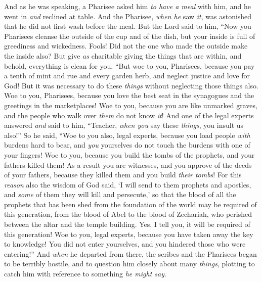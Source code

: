 \begin{biblechapter}
 And as he was speaking, a Pharisee asked him \textit{to have a meal} with him, and he went in \textit{and} reclined at table.
\verse And the Pharisee, \textit{when he} saw \textit{it}, was astonished that he did not first wash before the meal.
\verse But the Lord said to him, “Now you Pharisees cleanse the outside of the cup and of the dish, but your inside is full of greediness and wickedness.
\verse Fools! Did not the one who made the outside make the inside also?
\verse But give \textit{as} charitable giving the things that are within, and behold, everything is clean for you.
\verse “But woe to you, Pharisees, because you pay a tenth of mint and rue and every garden herb, and neglect justice and love for God! But it was necessary to do these \textit{things} without neglecting those things also.
\verse Woe to you, Pharisees, because you love the best seat in the synagogues and the greetings in the marketplaces!
\verse Woe to you, because you are like unmarked graves, and the people who walk over \textit{them} do not know \textit{it}!
\verse And one of the legal experts answered \textit{and} said to him, “Teacher, \textit{when you} say these \textit{things}, you insult us also!”
\verse So he said, “Woe to you also, legal experts, because you load people \textit{with} burdens hard to bear, and \textit{you} yourselves do not touch the burdens with one of your fingers!
\verse Woe to you, because you build the tombs of the prophets, and your fathers killed them!
\verse As a result you are witnesses, and you approve of the deeds of your fathers, because they killed them and you build \textit{their tombs}!
\verse For this \textit{reason} also the wisdom of God said, ‘I will send to them prophets and apostles, and \textit{some} of them they will kill and persecute,’
\verse so that the blood of all the prophets that has been shed from the foundation of the world may be required of this generation,
\verse from the blood of Abel to the blood of Zechariah, who perished between the altar and the temple building. Yes, I tell you, it will be required of this generation!
\verse Woe to you, legal experts, because you have taken away the key to knowledge! You did not enter yourselves, and you hindered those who were entering!”
\verse And \textit{when} he departed from there, the scribes and the Pharisees began to be terribly hostile, and to question him closely about many \textit{things},
\verse plotting to catch him with reference to something \textit{he might say}.
\end{biblechapter}

